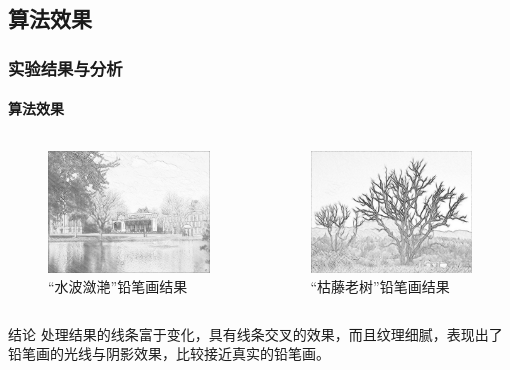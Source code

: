 \documentclass[aspectratio=43, xcolor=svgnames, t, 10pt]{beamer}
\begin{document}
\subsection{算法效果}

\begin{frame}
  \frametitle{实验结果与分析}
  \framesubtitle{算法效果}
\begin{columns}
  \begin{column}{0.5\linewidth}
    \begin{figure}
      \includegraphics[width=\linewidth]{./figure/thesis_rst-01.png}
      \caption{“水波潋滟”铅笔画结果}
    \end{figure}
  \end{column}
  \begin{column}{0.5\linewidth}
    \begin{figure}
      \includegraphics[width=\linewidth]{./figure/thesis_rst-03.png}
      \caption{“枯藤老树”铅笔画结果}
    \end{figure}
  \end{column}
\end{columns}
\begin{block}{结论}
  处理结果的线条富于变化，具有线条交叉的效果，而且纹理细腻，表现出了铅笔画的光线与阴影效果，比较接近真实的铅笔画。
\end{block}
\end{frame}
\end{document}
